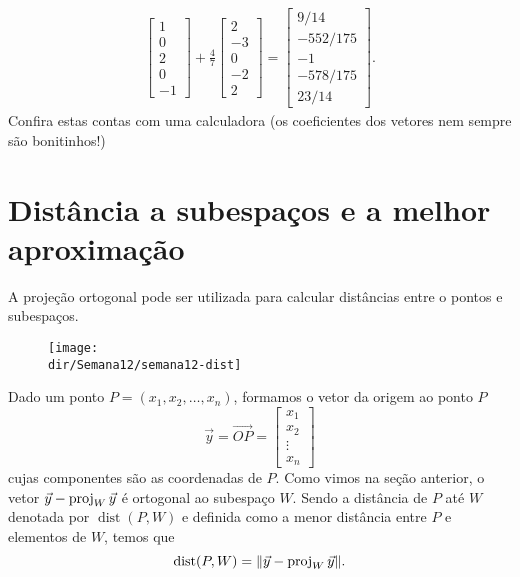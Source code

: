 \documentclass[../livro.tex]{subfiles}  %
\providecommand{\dir}{..}
\begin{document}
\begin{example}
\begin{align*}
\begin{bmatrix}
 1\\0\\2\\0\\-1
\end{bmatrix} + \frac{4}{7} \begin{bmatrix}
 2\\-3\\0\\-2\\ 2
\end{bmatrix} =
\begin{bmatrix}
 9/14 \\ -552/175 \\ -1 \\ -578/175 \\ 23/14
\end{bmatrix}.
  \end{align*}
Confira estas contas com uma calculadora (os coeficientes dos vetores nem sempre são bonitinhos!)
\end{example}



\section{Distância a subespaços e a melhor aproximação}


A projeção ortogonal pode ser utilizada para calcular distâncias entre o pontos e subespaços.

\begin{figure}[h!]
\begin{center}
\texttt{[image: \\dir/Semana12/semana12-dist]}
\end{center}
\end{figure}

\noindent Dado um ponto $P = (x_1, x_2, \dots, x_n)$, formamos o vetor da origem ao ponto $P$
\begin{equation}
\vec{y} = \vec{OP} =
\begin{bmatrix}
x_1 \\ x_2 \\ \vdots \\ x_n
\end{bmatrix}
\end{equation} cujas componentes são as coordenadas de $P$. Como vimos na seção anterior, o vetor $\vec{y} - \operatorname{proj}_{W} \vec{y}$ é ortogonal ao subespaço $W$. Sendo a distância de $P$ até $W$ denotada por $\operatorname{dist} (P,W)$ e definida como a menor distância entre $P$ e elementos de $W$, temos que
\begin{equation}
\operatorname{dist} (P,W) = \|\vec{y} - \operatorname{proj}_{W} \vec{y}\|.
\end{equation}
\end{document}
